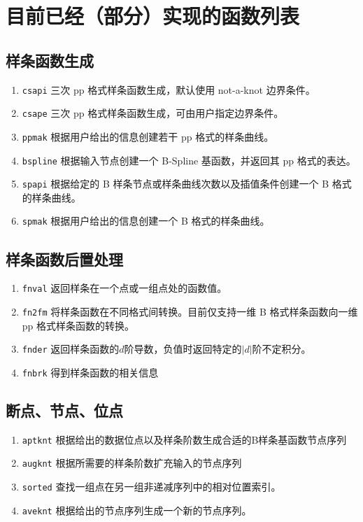 \section{目前已经（部分）实现的函数列表}

\subsection{样条函数生成}
\begin{enumerate}
      \item \texttt{csapi} 三次 pp 格式样条函数生成，默认使用 not-a-knot 边界条件。
      \item \texttt{csape} 三次 pp 格式样条函数生成，可由用户指定边界条件。
      \item \texttt{ppmak} 根据用户给出的信息创建若干 pp 格式的样条曲线。
      \item \texttt{bspline} 根据输入节点创建一个 B-Spline 基函数，并返回其 pp 格式的表达。
      \item \texttt{spapi} 根据给定的 B 样条节点或样条曲线次数以及插值条件创建一个 B 格式的样条曲线。
      \item \texttt{spmak} 根据用户给出的信息创建一个 B 格式的样条曲线。
\end{enumerate}

\subsection{样条函数后置处理}
\begin{enumerate}
      \item \texttt{fnval} 返回样条在一个点或一组点处的函数值。
      \item \texttt{fn2fm} 将样条函数在不同格式间转换。目前仅支持一维 B 格式样条函数向一维 pp 格式样条函数的转换。
      \item \texttt{fnder} 返回样条函数的$d$阶导数，负值时返回特定的$|d|$阶不定积分。
      \item \texttt{fnbrk} 得到样条函数的相关信息
\end{enumerate}

\subsection{断点、节点、位点}
\begin{enumerate}
      \item \texttt{aptknt} 根据给出的数据位点以及样条阶数生成合适的B样条基函数节点序列
      \item \texttt{augknt} 根据所需要的样条阶数扩充输入的节点序列
      \item \texttt{sorted} 查找一组点在另一组非递减序列中的相对位置索引。
      \item \texttt{aveknt} 根据给出的节点序列生成一个新的节点序列。
\end{enumerate}
